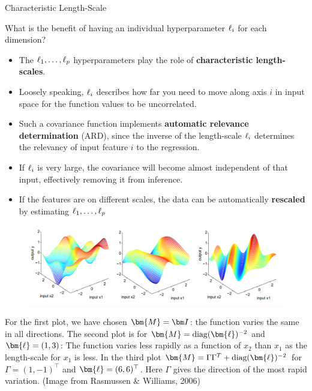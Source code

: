 \begin{frame}[c,allowframebreaks]{Characteristic Length-Scale}


\framebreak


What is the benefit of having an individual hyperparameter $\ell_i$ for each dimension?

\vspace{4mm}

\begin{itemize} 
\item The $\ell_1,\dots, \ell_p$ hyperparameters play the role of \textbf{characteristic length-scales}.
\vspace{2mm}
\item Loosely speaking, $\ell_i$ describes how far you need to move along axis $i$ in input space for the function values to be uncorrelated.
\vspace{2mm}
\item Such a covariance function implements \textbf{automatic relevance determination} (ARD), since the inverse of the length-scale $\ell_i$ determines the relevancy of input feature $i$ to the regression.
\vspace{2mm}
\item If $\ell_i$ is very large, the covariance will become almost independent of that input, effectively removing it from inference.
\vspace{2mm}
\item If the features are on different scales, the data can be automatically \textbf{rescaled} by estimating $\ell_1,\dots, \ell_p$ 

\end{itemize}



\framebreak


\begin{figure}
	\includegraphics[width = .8\textwidth]{figure_man/covariance2D.png}
\end{figure}

\vspace{3mm}
For the first plot, we have chosen $\bm{M} = \id$: the function varies the same in all directions. The second plot is for $\bm{M} = \text{diag}(\bm{\ls})^{-2}$ and $\bm{\ls} = \left(1, 3 \right)$: The function varies less rapidly as a function of $x_2$ than $x_1$ as the length-scale for $x_1$ is less. In the third plot $\bm{M} = \Gamma \Gamma^T + \text{diag}(\bm{\ls})^{-2}$ for $\Gamma = (1, -1)^\top$ and $\bm{\ls} = (6, 6)^\top$. Here $\Gamma$ gives the direction of the most rapid variation. (Image from Rasmussen \& Williams, 2006)


\end{frame}

\endlecture


